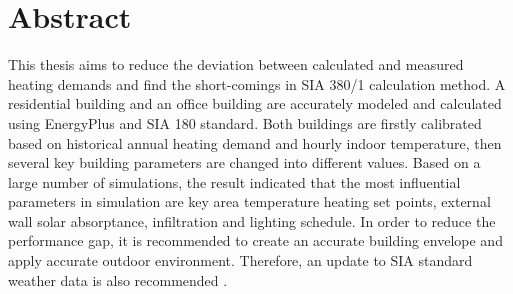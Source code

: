 




 \setcounter{tocdepth}{2}
 \tableofcontents

 \cleardoublepage


\chapter*{Abstract}
    This thesis aims to reduce the deviation between calculated and measured heating demands and find the short-comings in SIA 380/1 calculation method. A residential building and an office building are accurately modeled and calculated using EnergyPlus and SIA 180 standard. Both buildings are firstly calibrated based on historical annual heating demand and hourly indoor temperature, then several key building parameters are changed into different values. Based on a large number of simulations, the result indicated that the most influential parameters in simulation are key area temperature heating set points, external wall solar absorptance, infiltration and lighting schedule. In order to reduce the performance gap, it is recommended to create an accurate building envelope and apply accurate outdoor environment. Therefore, an update to SIA standard weather data is also recommended \cite{FREI2017421}.


 \cleardoublepage
